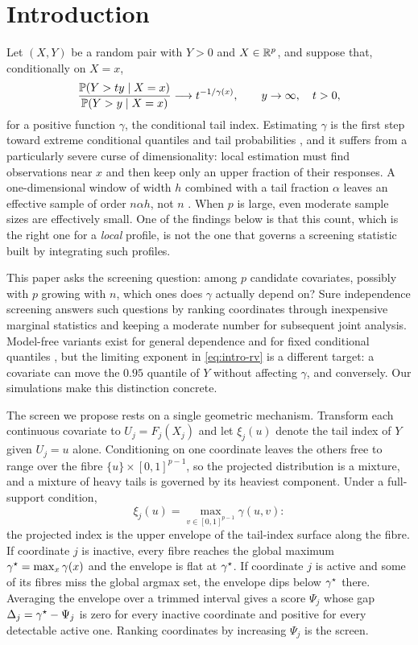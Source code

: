 \section{Introduction}\label{sec:intro}

Let $(X,Y)$ be a random pair with $Y>0$ and $X\in\mathbb R^p$, and suppose that,
conditionally on $X=x$,
\begin{equation}\label{eq:intro-rv}
 \frac{\mathbb P(Y>ty\mid X=x)}{\mathbb P(Y>y\mid X=x)}
 \longrightarrow t^{-1/\gamma(x)},\qquad y\to\infty,\quad t>0,
\end{equation}
for a positive function $\gamma$, the conditional tail index. Estimating
$\gamma$ is the first step toward extreme conditional quantiles and tail
probabilities \citep{deHaanFerreira2006,hill1975}, and it suffers from a
particularly severe curse of dimensionality: local estimation must find
observations near $x$ and then keep only an upper fraction of their
responses. A one-dimensional window of width $h$ combined with a tail
fraction $\alpha$ leaves an effective sample of order $n\alpha h$, not $n$
\citep{daouiaEtAl2013,gardesStupfler2014}. When $p$ is large, even moderate
sample sizes are effectively small. One of the findings below is that this
count, which is the right one for a \emph{local} profile, is not the one
that governs a screening statistic built by integrating such profiles.

This paper asks the screening question: among $p$ candidate covariates,
possibly with $p$ growing with $n$, which ones does $\gamma$ actually depend
on? Sure independence screening \citep{fanLv2008} answers such questions by
ranking coordinates through inexpensive marginal statistics and keeping a
moderate number for subsequent joint analysis. Model-free variants exist for
general dependence \citep{liZhongZhu2012} and for fixed conditional quantiles
\citep{heWangHong2013}, but the limiting exponent in \eqref{eq:intro-rv} is a
different target: a covariate can move the $0.95$ quantile of $Y$ without
affecting $\gamma$, and conversely. Our simulations make this distinction
concrete.

The screen we propose rests on a single geometric mechanism. Transform each
continuous covariate to $U_j=F_j(X_j)$ and let $\xi_j(u)$ denote the tail
index of $Y$ given $U_j=u$ alone. Conditioning on one coordinate leaves the
others free to range over the fibre $\{u\}\times[0,1]^{p-1}$, so the
projected distribution is a mixture, and a mixture of heavy tails is governed
by its heaviest component. Under a full-support condition,
\begin{equation}\label{eq:intro-envelope}
 \xi_j(u)=\max_{v\in[0,1]^{p-1}}\gamma(u,v):
\end{equation}
the projected index is the upper envelope of the tail-index surface along the
fibre. If coordinate $j$ is inactive, every fibre reaches the global maximum
$\gamma^\star=\max_x\gamma(x)$ and the envelope is flat at $\gamma^\star$. If coordinate
$j$ is active and some of its fibres miss the global argmax set, the envelope
dips below $\gamma^\star$ there. Averaging the envelope over a trimmed interval
gives a score $\Psi_j$ whose gap $\Delta_j=\gamma^\star-\Psi_j$ is zero for every
inactive coordinate and positive for every detectable active one. Ranking
coordinates by increasing $\Psi_j$ is the screen.

